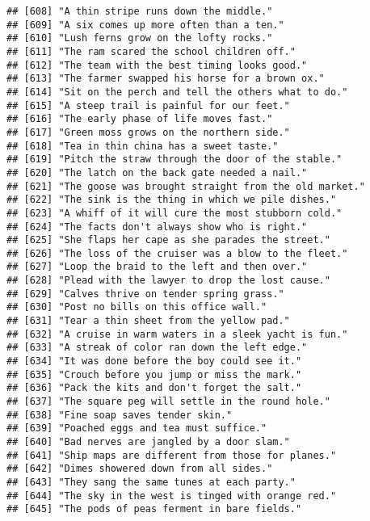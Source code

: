 \documentclass[
]{article}
\begin{document}
\begin{verbatim}
## [608] "A thin stripe runs down the middle."                      
## [609] "A six comes up more often than a ten."                    
## [610] "Lush ferns grow on the lofty rocks."                      
## [611] "The ram scared the school children off."                  
## [612] "The team with the best timing looks good."                
## [613] "The farmer swapped his horse for a brown ox."             
## [614] "Sit on the perch and tell the others what to do."         
## [615] "A steep trail is painful for our feet."                   
## [616] "The early phase of life moves fast."                      
## [617] "Green moss grows on the northern side."                   
## [618] "Tea in thin china has a sweet taste."                     
## [619] "Pitch the straw through the door of the stable."          
## [620] "The latch on the back gate needed a nail."                
## [621] "The goose was brought straight from the old market."      
## [622] "The sink is the thing in which we pile dishes."           
## [623] "A whiff of it will cure the most stubborn cold."          
## [624] "The facts don't always show who is right."                
## [625] "She flaps her cape as she parades the street."            
## [626] "The loss of the cruiser was a blow to the fleet."         
## [627] "Loop the braid to the left and then over."                
## [628] "Plead with the lawyer to drop the lost cause."            
## [629] "Calves thrive on tender spring grass."                    
## [630] "Post no bills on this office wall."                       
## [631] "Tear a thin sheet from the yellow pad."                   
## [632] "A cruise in warm waters in a sleek yacht is fun."         
## [633] "A streak of color ran down the left edge."                
## [634] "It was done before the boy could see it."                 
## [635] "Crouch before you jump or miss the mark."                 
## [636] "Pack the kits and don't forget the salt."                 
## [637] "The square peg will settle in the round hole."            
## [638] "Fine soap saves tender skin."                             
## [639] "Poached eggs and tea must suffice."                       
## [640] "Bad nerves are jangled by a door slam."                   
## [641] "Ship maps are different from those for planes."           
## [642] "Dimes showered down from all sides."                      
## [643] "They sang the same tunes at each party."                  
## [644] "The sky in the west is tinged with orange red."           
## [645] "The pods of peas ferment in bare fields."                 

\end{verbatim}
\end{document}
